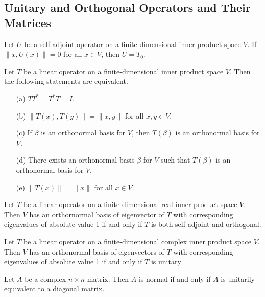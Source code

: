 \subsection{Unitary and Orthogonal Operators and Their Matrices}
\begin{lemma}
    Let \(U\) be a self-adjoint operator on a finite-dimensional inner product space \(V\). If \(\lVert x, U(x) \rVert = 0\) for all \(x \in V\), then \(U = T_0\).
\end{lemma}
\vspace{3cm}
\begin{theorem}
    Let \(T\) be a linear operator on a finite-dimensional inner product space \(V\). Then the following statements are equivalent.
    \begin{enumerate}
        \item[(a)] \(TT^* = T^*T = I\). 
        \item[(b)] \(\lVert T(x), T(y) \rVert = \lVert x, y \rVert\) for all \(x, y \in V\).
        \item[(c)] If \(\beta\) is an orthonormal basis for \(V\), then \(T(\beta)\) is an orthonormal basis for \(V\).
        \item[(d)] There exists an orthonormal basis \(\beta\) for \(V\) such that \(T(\beta)\) is an orthonormal basis for \(V\).
        \item[(e)] \(\lVert T(x) \rVert = \lVert x \rVert\) for all \(x \in V\).
    \end{enumerate}
\end{theorem}
\newpage
\begin{corollary}
    Let \(T\) be a linear operator on a finite-dimensional real inner product space \(V\). Then \(V\) has an orthornormal basis of eigenvector of \(T\) with corresponding eigenvalues of absolute value 1 if and only if \(T\) is both self-adjoint and orthogonal.
\end{corollary}
\vspace{5cm}
\begin{corollary}
    Let \(T\) be a linear operator on a finite-dimensional complex inner product space \(V\). Then \(V\) has an orthonormal basis of eigenvectors of \(T\) with corresponding eigenvalues of absolute value 1 if and only if \(T\) is unitary
\end{corollary}
\vspace{1cm}
\begin{theorem}
    Let \(A\) be a complex \(n \times n\) matrix. Then \(A\) is normal if and only if \(A\) is unitarily equivalent to a diagonal matrix.
\end{theorem}
